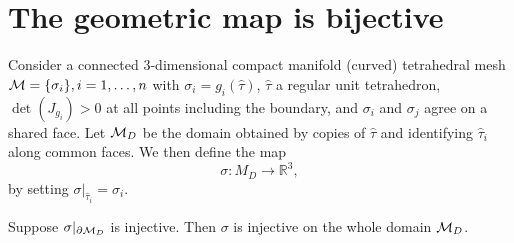 \section{The geometric map is bijective}\label{cumin:sec:bij-proof}

Consider a connected 3-dimensional compact manifold {(curved)} tetrahedral mesh $\mathcal{M} = \{\sigma_i \}, i=1,\dots,n$ with
$\sigma_i = g_i(\hat \tau)$, $\hat \tau$ a regular unit tetrahedron, $\det(J_{g_i}) > 0$ at all points including the boundary, and $\sigma_i$ and $\sigma_j$ agree on a shared face. 
%
Let $\mathcal{M}_D$ be the domain obtained by copies of  $\hat \tau$ and identifying $\hat \tau_i$ along common faces. We then define the map 
\[
\sigma\colon M_D \to \mathbb{R}^3,
\]
by setting $\sigma|_{\hat \tau_i} = \sigma_i$.

\begin{proposition}
Suppose $\sigma|_{\partial\mathcal{M}_D}$ is injective. Then $\sigma$ is injective on the whole domain $\mathcal{M}_D$. 
\end{proposition}
